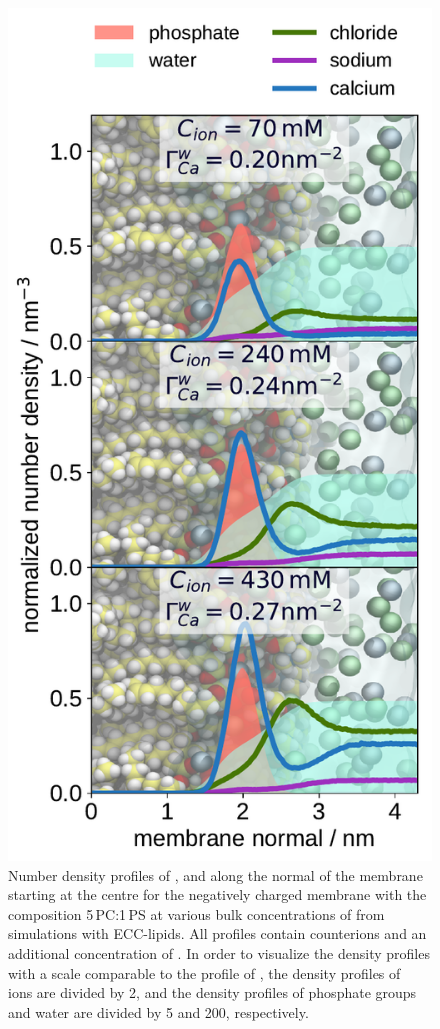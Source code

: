 \begin{figure}[htbp!] 
  \centering 
  \includegraphics[width=\figwidth]{../img/ecc_pops/density_profiles_ca_na_cl_wat_phos_models-compar_1-3_CaCl2-series.pdf}
  \caption{\label{fig:cacl-dens_PCPS} 
    Number density profiles of ,  and  along the normal of the membrane starting at the centre
    for the negatively charged membrane with the composition 5\,PC:1\,PS
    at various bulk concentrations of  from simulations with ECC-lipids. 
    All profiles contain  counterions and an additional concentration of . 
    In order to visualize the density profiles with a scale comparable to the profile of ,  
    the density profiles of~ ions are divided by 2, and 
    the density profiles of phosphate groups and water are divided by 5 and 200, respectively.  
    } 
\end{figure} 

